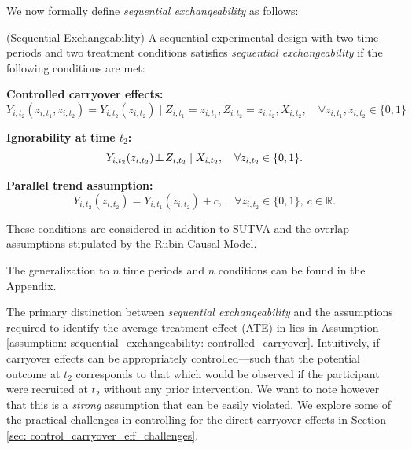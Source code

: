 \noindent
We now formally define \emph{sequential exchangeability} as follows:

\begin{assumption}(Sequential Exchangeability)
\label{assumption: sequential_exchangeability}
 A sequential experimental design with two time periods and two treatment conditions satisfies \emph{sequential exchangeability} if the following conditions are met:
    \begin{assumptionnum}
        \item \label{assumption: sequential_exchangeability: controlled_carryover} 
        \textbf{Controlled carryover effects: } 
        \[
        Y_{i,t_2}(z_{i,t_1}, z_{i,t_2}) = Y_{i,t_2}(z_{i,t_2}) \mid Z_{i,t_1} = z_{i,t_1}, Z_{i,t_2} = z_{i,t_2}, X_{i,t_2}, \quad \forall z_{i,t_1}, z_{i,t_2} \in \{0,1\}
        \] 

        \item \label{assumption: sequential_exchangeability: ignorability_t2} 
        \textbf{Ignorability at time $t_2$:} 
        \[
        Y_{i,t_2}(z_{i,t_2}) \hspace{-.2em}\perp\!\!\!\!\perp\hspace{-.2em}  Z_{i,t_2} \mid X_{i,t_2}, \quad  \forall z_{i,t_2} \in \{0,1\}.
        \]
        \item \label{assumption: sequential_exchangeability: parallel_trend} 
        \textbf{Parallel trend assumption:} 
        \[
        Y_{i,t_2}(z_{i,t_2}) = Y_{i,t_1}(z_{i,t_2}) + c, \quad \forall z_{i,t_2} \in \{0,1\},\ c \in \mathbb{R}.
        \]
    \end{assumptionnum}
    These conditions are considered in addition to SUTVA and the overlap assumptions stipulated by the Rubin Causal Model.
\end{assumption}

\noindent 
The generalization to $n$ time periods and $n$ conditions can be found in the Appendix.

The primary distinction between \emph{sequential exchangeability} and the assumptions required to identify the average treatment effect (ATE) in \cwsd{} lies in Assumption \ref{assumption: sequential_exchangeability: controlled_carryover}. Intuitively, if carryover effects can be appropriately controlled—such that the potential outcome at $t_2$ corresponds to that which would be observed if the participant were recruited at $t_2$ without any prior intervention. We want to note however that this is a \emph{strong} assumption that can be easily violated. We explore some of the practical challenges in controlling for the direct carryover effects in Section \ref{sec: control_carryover_eff_challenges}.


